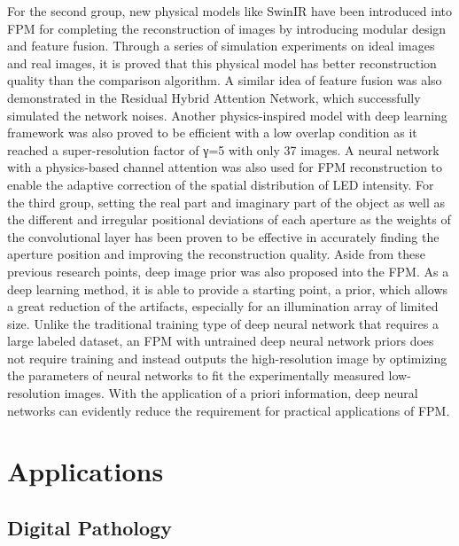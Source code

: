 \documentclass[journal,review,submit,pdftex,moreauthors]{Definitions/mdpi}
\begin{document}
For the second group, new physical models like SwinIR have been introduced into FPM for completing the reconstruction of images by introducing modular design and feature fusion\cite{wang2022fourier}. Through a series of simulation experiments on ideal images and real images, it is proved that this physical model has better reconstruction quality than the comparison algorithm. A similar idea of feature fusion was also demonstrated in the Residual Hybrid Attention Network\cite{li2023fourier}, which successfully simulated the network noises. Another physics-inspired model with deep learning framework was also proved to be efficient with a low overlap condition as it reached a super-resolution factor of γ=5 with only 37 images\cite{bouchama2023physics}. A neural network with a physics-based channel attention was also used for FPM reconstruction to enable the adaptive correction of the spatial distribution of LED intensity\cite{zhang2022physics}.
For the third group, setting the real part and imaginary part of the object as well as the different and irregular positional deviations of each aperture as the weights of the convolutional layer has been proven to be effective in accurately finding the aperture position and improving the
reconstruction quality\cite{zhao2021neural}.
Aside from these previous research points, deep image prior was also proposed into the FPM. As a deep learning method, it is able to provide a starting point, a prior, which allows a great reduction of the artifacts, especially for an illumination array of limited size\cite{guzzi2021deep}. Unlike the traditional training type of deep neural network that requires a large labeled dataset, an FPM with untrained deep neural network priors does not require training and instead outputs the high-resolution image by optimizing the parameters of neural networks to fit the experimentally measured low-resolution images\cite{chen2022fourier}. With the application of a priori information, deep neural networks can evidently reduce the requirement for practical applications of FPM\cite{yang2022fourier}.

\section{Applications}
\subsection{Digital Pathology}
\end{document}
